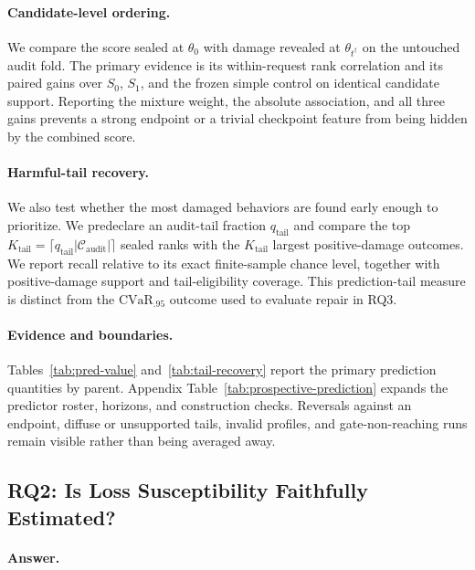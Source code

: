\paragraph{Candidate-level ordering.}
We compare the score sealed at $\theta_0$ with damage revealed at
$\theta_{t^\dagger}$ on the untouched audit fold. The primary evidence is its
within-request rank correlation and its paired gains over $S_0$, $S_1$, and
the frozen simple control on identical candidate support. Reporting the
mixture weight, the absolute association, and all three gains prevents a
strong endpoint or a trivial checkpoint feature from being hidden by the
combined score.

\paragraph{Harmful-tail recovery.}
We also test whether the most damaged behaviors are found early enough to
prioritize. We predeclare an audit-tail fraction
$q_{\mathrm{tail}}$ and compare the top
$K_{\mathrm{tail}}=\lceil q_{\mathrm{tail}}
|\mathcal C_{\mathrm{audit}}|\rceil$ sealed ranks with the
$K_{\mathrm{tail}}$ largest positive-damage outcomes. We report recall
relative to its exact finite-sample chance level, together with
positive-damage support and tail-eligibility coverage. This prediction-tail
measure is distinct from the $\mathrm{CVaR}_{.95}$ outcome used to evaluate
repair in RQ3.

\paragraph{Evidence and boundaries.}
Tables~\ref{tab:pred-value} and~\ref{tab:tail-recovery} report the primary
prediction quantities by parent. Appendix Table~\ref{tab:prospective-prediction} expands the predictor
roster, horizons, and construction checks. Reversals against an endpoint,
diffuse or unsupported tails, invalid profiles, and gate-non-reaching runs
remain visible rather than being averaged away.

\subsection{RQ2: Is Loss Susceptibility Faithfully Estimated?}
\label{sec:exp-fidelity}

\paragraph{Answer.}
{\setlength{\emergencystretch}{3em}\FidelityHeadline\par}

